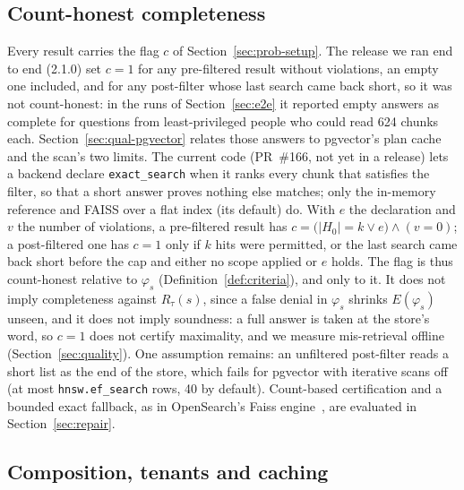 \subsection{Count-honest completeness}\label{sec:sys-complete}

Every result carries the flag $c$ of Section~\ref{sec:prob-setup}. The release we ran end to end
(2.1.0) set $c = 1$ for any pre-filtered result without violations, an empty one included, and for any
post-filter whose last search came back short, so it was not count-honest: in the runs of
Section~\ref{sec:e2e} it reported empty answers as complete for questions from least-privileged people who could read
624 chunks each. Section~\ref{sec:qual-pgvector} relates those answers to pgvector's plan cache and the
scan's two limits. The current code (PR~\#166, not yet in a release) lets a backend declare \texttt{exact\_search} when it ranks every chunk that satisfies the filter, so that a
short answer proves nothing else matches; only the in-memory reference and FAISS over a flat index
(its default) do. With $e$ the declaration and $v$ the number of violations, a pre-filtered result has
$c = \bigl(|H_0| = k \vee e\bigr) \wedge (v = 0)$; a post-filtered one has $c = 1$ only if $k$ hits
were permitted, or the last search came back short before the cap and either no scope applied or $e$
holds. The flag is thus count-honest relative to $\varphi_s$ (Definition~\ref{def:criteria}), and only
to it. It does not imply completeness against $R_\tau(s)$, since a false denial in $\varphi_s$ shrinks
$E(\varphi_s)$ unseen, and it does not imply soundness: a full answer is taken at the store's word, so
$c = 1$ does not certify maximality, and we measure mis-retrieval offline
(Section~\ref{sec:quality}). One assumption remains: an unfiltered post-filter reads a short list as
the end of the store, which fails for pgvector with iterative scans off (at most
\texttt{hnsw.ef\_search} rows, 40 by default). Count-based certification and a bounded exact
fallback, as in OpenSearch's Faiss engine~\cite{opensearch2026efficient}, are evaluated in Section~\ref{sec:repair}.

\subsection{Composition, tenants and caching}\label{sec:sys-compose}

